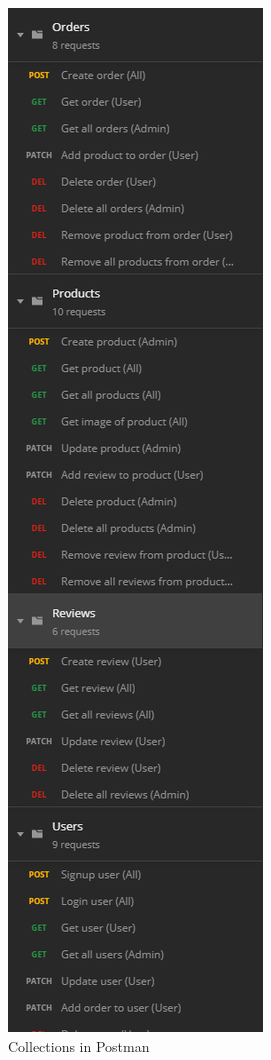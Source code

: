 \begin{figure}[H]
 \centering
 \includegraphics[width=\textwidth,height=0.6\textheight,keepaspectratio]{images/Postman_Collections.png}
 \caption{Collections in Postman}
 \label{fig:collections-postman}
\end{figure}

